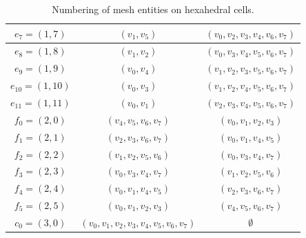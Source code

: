 \begin{table}[H]
\begin{center}
\begin{tabular}{|c|c|c|}
      \hline
      $e_7 = (1, 7)$ & $(v_1, v_5)$ & $(v_0, v_2, v_3, v_4, v_6, v_7)$ \\
      \hline
      $e_8 = (1, 8)$ & $(v_1, v_2)$ & $(v_0, v_3, v_4, v_5, v_6, v_7)$ \\
      \hline
      $e_9 = (1, 9)$ & $(v_0, v_4)$ & $(v_1, v_2, v_3, v_5, v_6, v_7)$ \\
      \hline
      $e_{10} = (1, 10)$ & $(v_0, v_3)$ & $(v_1, v_2, v_4, v_5, v_6, v_7)$ \\
      \hline
      $e_{11} = (1, 11)$ & $(v_0, v_1)$ & $(v_2, v_3, v_4, v_5, v_6, v_7)$ \\
      \hline
      $f_0 = (2, 0)$ & $(v_4, v_5, v_6, v_7)$ & $(v_0, v_1, v_2, v_3)$ \\
      \hline
      $f_1 = (2, 1)$ & $(v_2, v_3, v_6, v_7)$ & $(v_0, v_1, v_4, v_5)$ \\
      \hline
      $f_2 = (2, 2)$ & $(v_1, v_2, v_5, v_6)$ & $(v_0, v_3, v_4, v_7)$ \\
      \hline
      $f_3 = (2, 3)$ & $(v_0, v_3, v_4, v_7)$ & $(v_1, v_2, v_5, v_6)$ \\
      \hline
      $f_4 = (2, 4)$ & $(v_0, v_1, v_4, v_5)$ & $(v_2, v_3, v_6, v_7)$ \\
      \hline
      $f_5 = (2, 5)$ & $(v_0, v_1, v_2, v_3)$ & $(v_4, v_5, v_6, v_7)$ \\
      \hline
      $c_0 = (3, 0)$ & $(v_0, v_1, v_2, v_3, v_4, v_5, v_6, v_7)$ & $\emptyset$ \\
      \hline
    \end{tabular}
    \caption{Numbering of mesh entities on hexahedral cells.}
    \label{tab:hexahedron,entities}
  \end{center}
\end{table}
